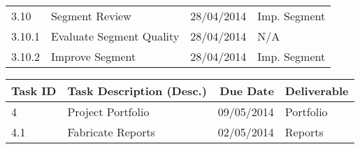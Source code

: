\begin{tabular}{llrl}
    3.10     & Segment Review               & 28/04/2014  & Imp. Segment      \\
    3.10.1   & Evaluate Segment Quality     & 28/04/2014  & N/A               \\
    3.10.2   & Improve Segment              & 28/04/2014  & Imp. Segment      \\
    
    \bottomrule
\end{tabular}


\begin{tabular}{llrl}
    
    \toprule
    
    Task ID  & Task Description (Desc.)     & Due Date    & Deliverable       \\
    
    \midrule
    
    4        & Project Portfolio            & 09/05/2014  & Portfolio         \\
    4.1      & Fabricate Reports            & 02/05/2014  & Reports           \\
    
    \bottomrule

\end{tabular}
